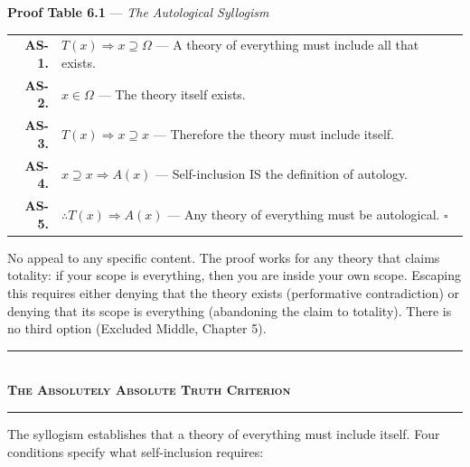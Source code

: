 \documentclass[10pt, openany, oneside]{book}
\renewcommand{\normalsize}{\fontsize{10}{13}\selectfont}
\renewcommand{\footnotesize}{\fontsize{8.5}{11}\selectfont}
\begin{document}
\vspace{0.5em}

\textbf{Proof Table 6.1} --- \textit{The Autological Syllogism}

\vspace{0.5em}

{\footnotesize
\noindent\begin{tabular}{r p{}}
\textbf{AS-1.} & $T(x) \Rightarrow x \supseteq \Omega$ --- A theory of everything must include all that exists. \\[0.3em]
\textbf{AS-2.} & $x \in \Omega$ --- The theory itself exists. \\[0.3em]
\textbf{AS-3.} & $T(x) \Rightarrow x \supseteq x$ --- Therefore the theory must include itself. \\[0.3em]
\textbf{AS-4.} & $x \supseteq x \Rightarrow A(x)$ --- Self-inclusion IS the definition of autology. \\[0.3em]
\textbf{AS-5.} & $\therefore T(x) \Rightarrow A(x)$ --- Any theory of everything must be autological. $\square$ \\[0.3em]
\end{tabular}
}

\vspace{0.8em}

\noindent No appeal to any specific content. The proof works for any theory that claims totality: if your scope is everything, then you are inside your own scope. Escaping this requires either denying that the theory exists (performative contradiction) or denying that its scope is everything (abandoning the claim to totality). There is no third option (Excluded Middle, Chapter 5).

\vspace{1.5em}


\begin{center}
    \rule{0.3\textwidth}{0.4pt}\\[0.5em]
    {\normalsize\bfseries\scshape The Absolutely Absolute Truth Criterion}\\[0.3em]
    \rule{0.3\textwidth}{0.4pt}
\end{center}

\vspace{1em}

\noindent The syllogism establishes that a theory of everything must include itself. Four conditions specify what self-inclusion requires:
\end{document}
